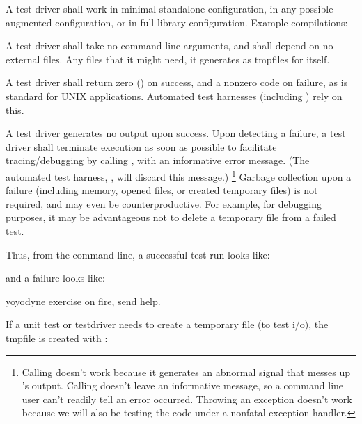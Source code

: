 A test driver shall work in minimal standalone configuration, in any
possible augmented configuration, or in full library
configuration. Example compilations:
\begin{cchunk}
\end{cchunk}

A test driver shall take no command line arguments, and shall depend
on no external files.  Any files that it might need, it generates as
tmpfiles for itself. 

A test driver shall return zero () on success, and a
nonzero code on failure, as is standard for UNIX
applications. Automated test harnesses (including ) rely on
this.

A test driver generates no output upon success. Upon detecting a
failure, a test driver shall terminate execution as soon as possible
to facilitate tracing/debugging by calling , with
an informative error message. (The automated test harness,
, will discard this message.) \footnote{Calling
 doesn't work because it generates an abnormal signal
that messes up 's output. Calling  doesn't
leave an informative message, so a command line user can't readily
tell an error occurred.  Throwing an exception doesn't work because we
will also be testing the code under a nonfatal exception handler.}
Garbage collection upon a failure (including memory, opened files, or
created temporary files) is not required, and may even be
counterproductive.  For example, for debugging purposes, it may be
advantageous not to delete a temporary file from a failed test.

Thus, from the command line, a successful test run looks like:

\begin{cchunk}
\end{cchunk}

and a failure looks like:

\begin{cchunk}
      yoyodyne exercise on fire, send help.
\end{cchunk}

If a unit test or testdriver needs to create a temporary file (to test
i/o), the tmpfile is created with :

